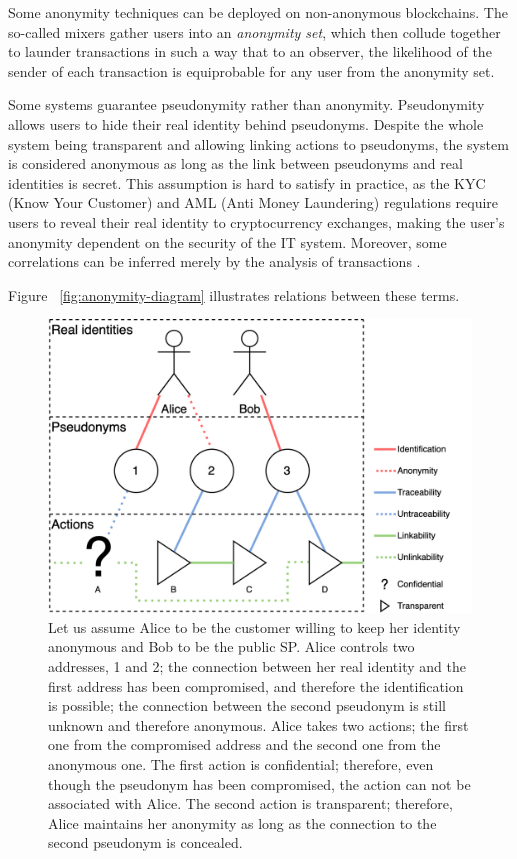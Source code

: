 \documentclass[pdftex,twocolumn,epjc3]{svjour3}
\begin{document}
{Some anonymity techniques can be deployed on non-anonymous blockchains. The so-called mixers gather users into an \textit{anonymity set}, which then collude together to launder transactions in such a way that to an observer, the likelihood of the sender of each transaction is equiprobable for any user from the anonymity set.

Some systems guarantee pseudonymity rather than anonymity. Pseudonymity allows users to hide their real identity behind pseudonyms. Despite the whole system being transparent and allowing linking actions to pseudonyms, the system is considered anonymous as long as the link between pseudonyms and real identities is secret. This assumption is hard to satisfy in practice, as the KYC (Know Your Customer) and AML (Anti Money Laundering) regulations require users to reveal their real identity to cryptocurrency exchanges, making the user's anonymity dependent on the security of the IT system. Moreover, some correlations can be inferred merely by the analysis of transactions \cite{androulakiEvaluatingUserPrivacy2013, oberStructureAnonymityBitcoin2013}.

Figure ~\ref{fig:anonymity-diagram} illustrates relations between these terms.

\begin{figure}[h!]
\includegraphics[width=\linewidth]{anonymity-diagram.png}
\centering
\caption{Let us assume Alice to be the customer willing to keep her identity anonymous and Bob to be the public SP. Alice controls two addresses, 1 and 2; the connection between her real identity and the first address has been compromised, and therefore the identification is possible; the connection between the second pseudonym is still unknown and therefore anonymous. Alice takes two actions; the first one from the compromised address and the second one from the anonymous one. The first action is confidential; therefore, even though the pseudonym has been compromised, the action can not be associated with Alice. The second action is transparent; therefore, Alice maintains her anonymity as long as the connection to the second pseudonym is concealed.}


\end{figure}}
\end{document}
